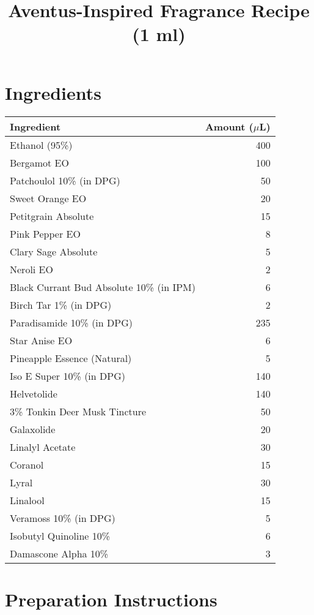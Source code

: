 \documentclass{article}
\title{Aventus-Inspired Fragrance Recipe (1 ml)}
\author{}
\date{}
\begin{document}
\maketitle

\section{Ingredients}

\begin{table}[h]
\centering
\begin{tabular}{lr}
\toprule
\textbf{Ingredient} & \textbf{Amount ($\mu$L)} \\
\midrule
Ethanol (95\%) & 400 \\
Bergamot EO & 100 \\
Patchoulol 10\% (in DPG) & 50 \\
Sweet Orange EO & 20 \\
Petitgrain Absolute & 15 \\
Pink Pepper EO & 8 \\
Clary Sage Absolute & 5 \\
Neroli EO & 2 \\
Black Currant Bud Absolute 10\% (in IPM) & 6 \\
Birch Tar 1\% (in DPG) & 2 \\
Paradisamide 10\% (in DPG) & 235 \\
Star Anise EO & 6 \\
Pineapple Essence (Natural) & 5 \\
Iso E Super 10\% (in DPG) & 140 \\
Helvetolide & 140 \\
3\% Tonkin Deer Musk Tincture & 50 \\
Galaxolide & 20 \\
Linalyl Acetate & 30 \\
Coranol & 15 \\
Lyral & 30 \\
Linalool & 15 \\
Veramoss 10\% (in DPG) & 5 \\
Isobutyl Quinoline 10\% & 6 \\
Damascone Alpha 10\% & 3 \\
\bottomrule
\end{tabular}
\end{table}

\section{Preparation Instructions}
\end{document}
